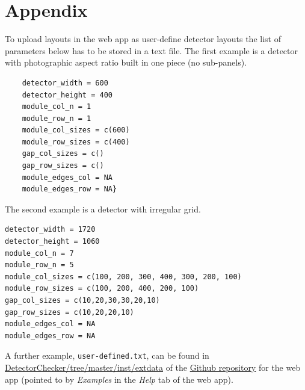 \documentclass[11pt,a4paper]{article}
\begin{document}
\section{Appendix}\label{appendix}

To upload layouts in the web app as user-define detector layouts the list of parameters below has to be stored in a text file. The first example is a detector with photographic aspect ratio built in one piece (no sub-panels).

\begin{verbatim}
	detector_width = 600
	detector_height = 400
	module_col_n = 1
	module_row_n = 1
	module_col_sizes = c(600)
	module_row_sizes = c(400)
	gap_col_sizes = c()
	gap_row_sizes = c()
	module_edges_col = NA
	module_edges_row = NA}
\end{verbatim}
	
The second example is a detector with irregular grid. 

\begin{verbatim}
detector_width = 1720
detector_height = 1060
module_col_n = 7
module_row_n = 5
module_col_sizes = c(100, 200, 300, 400, 300, 200, 100)
module_row_sizes = c(100, 200, 400, 200, 100)
gap_col_sizes = c(10,20,30,30,20,10)
gap_row_sizes = c(10,20,20,10)
module_edges_col = NA
module_edges_row = NA
\end{verbatim}

 A further example, \texttt{user-defined.txt}, can be found in
\href{https://github.com/alan-turing-institute/DetectorChecker/tree/master/inst/extdata}{DetectorChecker/tree/master/inst/extdata}
of the 
\href{https://doi.org/10.5281/zenodo.3662235}{Github repository}
for the web app
(pointed to by \emph{Examples} in the \emph{Help} tab of the web app).
\end{document}
